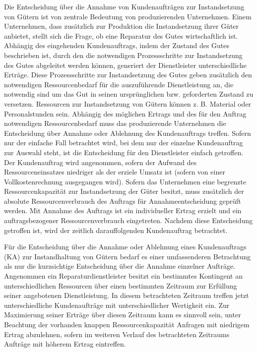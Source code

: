 Die Entscheidung über die Annahme von Kundenaufträgen zur Instandsetzung von Gütern ist von zentrale Bedeutung von produzierenden Unternehmen. Einem Unternehmen, dass zusätzlich zur Produktion die Instandsetzung ihrer Güter anbietet, stellt sich die Frage, ob eine Reparatur des Gutes wirtschaftlich ist. Abhängig des eingehenden Kundenauftrags, indem der Zustand des Gutes beschrieben ist, durch den die notwendigen Prozessschritte zur Instandsetzung des Gutes abgeleitet werden können, generiert der Dienstleister unterschiedliche Erträge. Diese Prozessschritte zur Instandsetzung des Gutes geben zusätzlich den notwendigen Ressourcenbedarf für die auszuführende Dienstleistung an, die notwendig sind um das Gut in seinen ursprünglichen bzw. geforderten Zustand zu versetzen. Ressourcen zur Instandsetzung von Gütern können z. B. Material oder Personalstunden sein. Abhängig des möglichen Ertrags und des für den Auftrag notwendigen Ressourcenbedarf muss das produzierende Unternehmen die Entscheidung über Annahme oder Ablehnung des Kundenauftrags treffen. Sofern nur der einfache Fall betrachtet wird, bei dem nur der einzelne Kundenauftrag zur Auswahl steht, ist die Entscheidung für den Dienstleister einfach getroffen. Der Kundenauftrag wird angenommen, sofern der Aufwand des Ressourceneinsatzes niedriger als der erziele Umsatz ist (sofern von einer Vollkostenrechnung ausgegangen wird). %
Sofern das Unternehmen eine begrenzte Ressourcenkapazität zur Instandsetzung der Güter besitzt, muss zusätzlich der absolute Ressourcenverbrauch des Auftrags für Annahmeentscheidung geprüft werden. Mit Annahme des Auftrags ist ein individueller Ertrag erzielt und ein auftragsbezogener Ressourcenverbrauch eingetreten. Nachdem diese Entscheidung getroffen ist, wird der zeitlich darauffolgenden Kundenauftrag betrachtet.

Für die Entscheidung über die Annahme oder Ablehnung eines Kundenauftrags (KA) zur Instandhaltung von Gütern bedarf es einer umfassenderen Betrachtung als nur die kurzsichtige Entscheidung über die Annahme einzelner Aufträge. Angenommen ein Reparaturdienstleister besitzt ein bestimmtes Kontingent an unterschiedlichen Ressourcen über einen bestimmten Zeitraum zur Erfüllung seiner angebotenen Dienstleistung. In diesem betrachteten Zeitraum treffen jetzt unterschiedliche Kundenaufträge mit unterschiedlicher Wertigkeit ein. Zur Maximierung seiner Erträge über diesen Zeitraum kann es sinnvoll sein, unter Beachtung der vorhanden knappen Ressourcenkapazität Anfragen mit niedrigem Ertrag abzulehnen, sofern im weiteren Verlauf des betrachteten Zeitraums Aufträge mit höherem Ertrag eintreffen.

